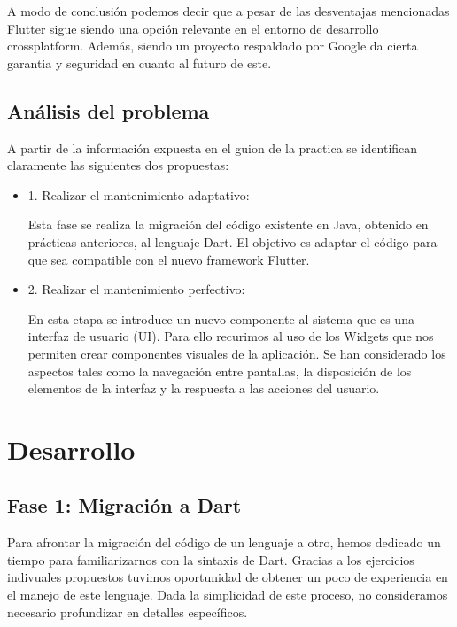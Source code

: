 \documentclass{article}
\begin{document}
A modo de conclusión podemos decir que a pesar de las desventajas mencionadas Flutter sigue siendo una opción relevante en el entorno de desarrollo crossplatform. Además, siendo un proyecto
respaldado por Google da cierta garantia y seguridad en cuanto al futuro de este. 

\subsection{Análisis del problema}
A partir de la información expuesta en el guion de la practica se identifican claramente las siguientes dos propuestas:

    \begin{itemize}
        \item 1. Realizar el mantenimiento adaptativo:

        Esta fase se realiza la migración del código existente en Java, obtenido en prácticas anteriores, al lenguaje Dart. El objetivo es adaptar el código para que sea compatible con el nuevo framework Flutter. 

        \item 2. Realizar el mantenimiento perfectivo:

        En esta etapa se introduce un nuevo componente al sistema que es una interfaz de usuario (UI). Para ello recurimos al uso de los Widgets que nos permiten crear componentes visuales de la aplicación.
        Se han considerado los aspectos tales como la navegación entre pantallas, la disposición de los elementos de la interfaz y la respuesta a las acciones del usuario. 
    \end{itemize}

\section{Desarrollo}

\subsection{Fase 1: Migración a Dart}

Para afrontar la migración del código de un lenguaje a otro, hemos dedicado un tiempo para familiarizarnos con la sintaxis de Dart. Gracias a los ejercicios indivuales propuestos tuvimos oportunidad de obtener un poco de experiencia en el manejo de este lenguaje. Dada la simplicidad de este proceso, no consideramos necesario profundizar en detalles específicos.
\end{document}
